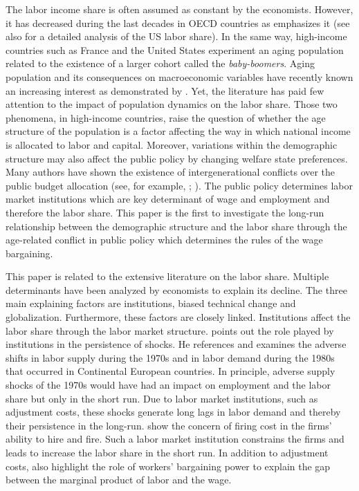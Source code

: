 

The labor income share is often assumed as constant by the economists. However, it has decreased during the last decades in OECD countries as \cite{Karabarbounis2014} emphasizes it (see also \cite{Elsby2013} for a detailed analysis of the US labor share).
In the same way, high-income countries such as France and the United States experiment an aging population related to the existence of a larger cohort called the \textit{baby-boomers}. Aging population and its consequences on macroeconomic variables have recently known an increasing interest as demonstrated by \cite{Sheiner2014}.
Yet, the literature has paid few attention to the impact of population dynamics on the labor share. Those two phenomena, in high-income countries, raise the question of whether the age structure of the population is a factor affecting the way in which national income is allocated to labor and capital. 
Moreover, variations within the demographic structure may also affect the public policy by changing welfare state preferences. Many authors have shown the existence of intergenerational conflicts over the public budget allocation (see, for example, \cite{Busemeyer2009}; \cite{Sorensen2013}). The public policy determines labor market institutions which are key determinant of wage and employment and therefore the labor share.
This paper is the first to investigate the long-run relationship between the demographic structure and the labor share through the age-related conflict in public policy which determines the rules of the wage bargaining.


This paper is related to the extensive literature on the labor share. Multiple determinants have been analyzed by economists to explain its decline. The three main explaining factors are institutions, biased technical change and globalization. Furthermore, these factors are closely linked.
Institutions affect the labor share through the labor market structure. \cite{Blanchard1997} points out the role played by institutions in the persistence of shocks. He references and examines the adverse shifts in labor supply during the 1970s and in labor demand during the 1980s that occurred in Continental European countries. In principle, adverse supply shocks of the 1970s would have had an impact on employment and the labor share but only in the short run. Due to labor market institutions, such as adjustment costs, these shocks generate long lags in labor demand and thereby their persistence in the long-run. \cite{Bentolila1990} show the concern of firing cost in the firms' ability to hire and fire. Such a labor market institution constrains the firms and leads to increase the labor share in the short run. In addition to adjustment costs, \cite{Bentolila2003} also highlight the role of workers' bargaining power to explain the gap between the marginal product of labor and the wage.

